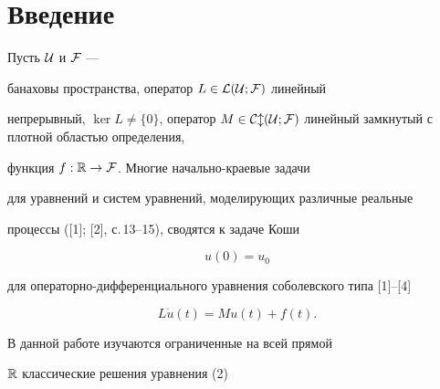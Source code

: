 \date{}




\pagestyle{plain} %







\maketitle


\label{begin}








\section*{Введение}





Пусть ${\cal U}$ и ${\cal F}$ ---


банаховы пространства, оператор $L\in \cal L(\cal U;\cal F)$ линейный


непрерывный, $\ker L\ne\{0\}$, оператор $M\in \cal C l(\cal


U;\cal F)$ линейный замкнутый с плотной областью определения,


функция $f:{\Bbb R}\to{\cal F}$. Многие начально-краевые задачи


для уравнений и систем уравнений, моделирующих различные реальные


процессы ([1]; [2], с.\,13--15), сводятся к задаче Коши


\begin{equation}


u(0)=u_0


\end{equation}


для операторно-дифференциального уравнения соболевского типа [1]--[4]


\begin{equation}


L\Dot{u}(t)=Mu(t)+f(t).


\end{equation}


В данной работе изучаются ограниченные на всей прямой 


${\Bbb R}$ классические решения уравнения (2)


